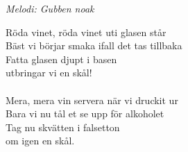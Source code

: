 {\footnotesize\textit{Melodi: Gubben noak}}\par
\vspace{10pt}
Röda vinet, röda vinet uti glasen står\\
Bäst vi börjar smaka ifall det tas tillbaka\\
Fatta glasen djupt i basen\\
utbringar vi en skål!\\
\\
Mera, mera vin servera när vi druckit ur\\
Bara vi nu tål et se upp för alkoholet\\
Tag nu skvätten i falsetton\\
om igen en skål.
